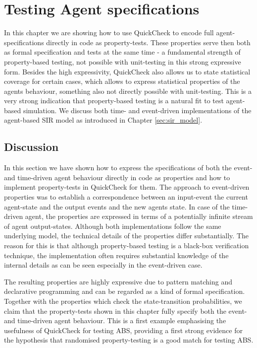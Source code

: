 \chapter{Testing Agent specifications}
\label{ch:agentspec}

In this chapter we are showing how to use QuickCheck to encode full agent-specifications directly in code as property-tests. These properties serve then both as formal specification and tests at the same time - a fundamental strength of property-based testing, not possible with unit-testing in this strong expressive form. Besides the high expressivity, QuickCheck also allows us to state statistical coverage for certain cases, which allows to express statistical properties of the agents behaviour, something also not directly possible with unit-testing. This is a very strong indication that property-based testing is a natural fit to test agent-based simulation. We discuss both time- and event-driven  implementations of the agent-based SIR model as introduced in Chapter \ref{sec:sir_model}.





\section{Discussion}
In this section we have shown how to express the specifications of both the event- and time-driven agent behaviour directly in code as properties and how to implement property-tests in QuickCheck for them. The approach to event-driven properties was to establish a correspondence between an input-event the current agent-state and the output events and the new agents state. In case of the time-driven agent, the properties are expressed in terms of a potentially infinite stream of agent output-states. Although both implementations follow the same underlying model, the technical details of the properties differ substantially. The reason for this is that although property-based testing is a black-box verification technique, the implementation often requires substantial knowledge of the internal details as can be seen especially in the event-driven case.

The resulting properties are highly expressive due to pattern matching and declarative programming and can be regarded as a kind of formal specification. Together with the properties which check the state-transition probabilities, we claim that the property-tests shown in this chapter fully specify both the event- and time-driven agent behaviour. This is a first example emphasising the usefulness of QuickCheck for testing ABS, providing a first strong evidence for the hypothesis that randomised property-testing is a good match for testing ABS.

